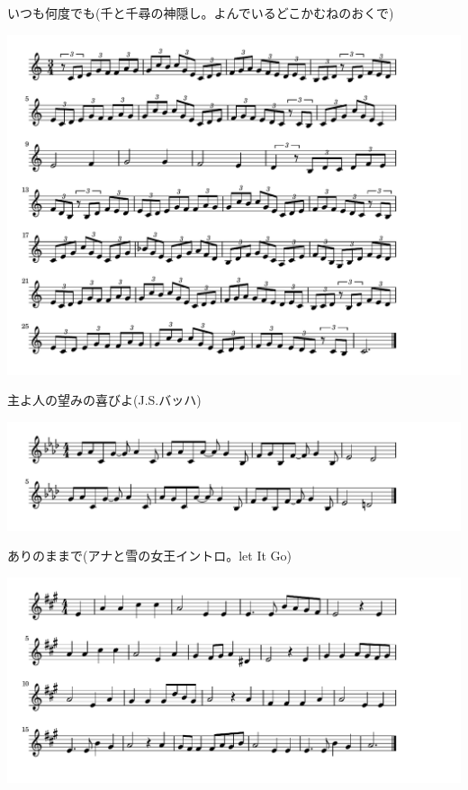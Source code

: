 \documentclass[a4paper]{ltjsarticle}
\begin{document}
\vspace{-10mm} \hspace{10mm}
いつも何度でも(千と千尋の神隠し。よんでいるどこかむねのおくで)

\includegraphics[clip]{shuyohitononozomino_crop.pdf}

\vspace{-10mm} \hspace{10mm}
主よ人の望みの喜びよ(J.S.バッハ)

\includegraphics[clip]{letitgointro_crop.pdf}

\vspace{-10mm} \hspace{10mm}
ありのままで(アナと雪の女王イントロ。let It Go)

\includegraphics[clip]{masu_crop.pdf}
\end{document}
